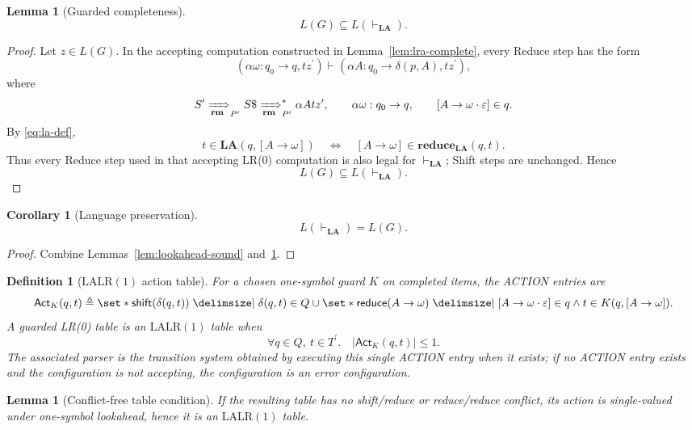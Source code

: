 \documentclass[11pt,a4paper]{article}
\theoremstyle{prettyplain}
\newtheorem{lemma}[theorem]{Lemma}
\newtheorem{corollary}[theorem]{Corollary}
\theoremstyle{prettydef}
\newtheorem{definition}[theorem]{Definition}
\def\mid{\;\delimsize\vert\;}#1%
\newcommand{\eps}{\varepsilon}
\newcommand{\LALRone}{\mathrm{LALR(1)}}
\newcommand{\RMP}{\xRightarrow[\mathbf{rm}]{}_{P^\prime}}
\newcommand{\Path}[3]{#1:#2\to#3}
\newcommand{\Item}[2]{[#1\to #2]}
\newcommand{\Look}{\mathbf{LA}}
\newcommand{\Reduce}{\mathbf{reduce}}
\begin{document}
\begin{lemma}[Guarded completeness]\label{lem:lookahead-complete}
\[
L(G)\subseteq L(\vdash_{\Look}).
\]
\end{lemma}

\begin{proof}
Let \(z\in L(G)\).  In the accepting computation constructed in
Lemma~\ref{lem:lra-complete}, every Reduce step has the form
\[
(\Path{\alpha\omega}{q_0}{q},t z^\prime)
\vdash
(\Path{\alpha A}{q_0}{\delta(p,A)},t z^\prime),
\]
where
\[
S^\prime\RMP S\$\RMP^*\alpha A t z^\prime,
\qquad
\Path{\alpha\omega}{q_0}{q},
\qquad
\Item{A}{\omega\cdot\eps}\in q.
\]
By \eqref{eq:la-def},
\[
t\in\Look(q,\Item{A}{\omega})
\quad\Longleftrightarrow\quad
\Item{A}{\omega}\in\Reduce_{\Look}(q,t).
\]
Thus every Reduce step used in that accepting LR(0) computation is also legal
for \(\vdash_{\Look}\); Shift steps are unchanged.  Hence
\[
L(G)\subseteq L(\vdash_{\Look}).
\]
\end{proof}

\begin{corollary}[Language preservation]\label{cor:lookahead-language}
\[
L(\vdash_{\Look})=L(G).
\]
\end{corollary}

\begin{proof}
Combine Lemmas~\ref{lem:lookahead-sound} and~\ref{lem:lookahead-complete}.
\end{proof}


\begin{definition}[\texorpdfstring{\(\LALRone\)}{LALR(1)} action table]\label{def:lalr-table}
For a chosen one-symbol guard \(K\) on completed items, the ACTION entries are
\[
\mathsf{Act}_K(q,t)
\triangleq
\set*{\mathsf{shift}(\delta(q,t))\mid \delta(q,t)\in Q}
\cup
\set*{\mathsf{reduce}(A\to\omega)
\mid
\Item{A}{\omega\cdot\eps}\in q
\land
t\in K(q,\Item{A}{\omega})}.
\]
A guarded LR(0) table is an \(\LALRone\) table when
\[
\forall q\in Q,\ t\in T^\prime.\quad |\mathsf{Act}_K(q,t)|\le 1 .
\]
The associated parser is the transition system obtained by executing this
single ACTION entry when it exists; if no ACTION entry exists and the
configuration is not accepting, the configuration is an error configuration.
\end{definition}

\begin{lemma}[Conflict-free table condition]\label{lem:lookahead-table}
If the resulting table has no shift/reduce or reduce/reduce conflict, its
action is single-valued under one-symbol lookahead, hence it is an
\(\LALRone\) table.
\end{lemma}
\end{document}
